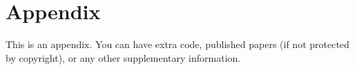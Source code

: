 
\chapter{Appendix}\label{a-appendix}

This is an appendix.
You can have extra code, published papers (if not protected by copyright), or any other supplementary information.
